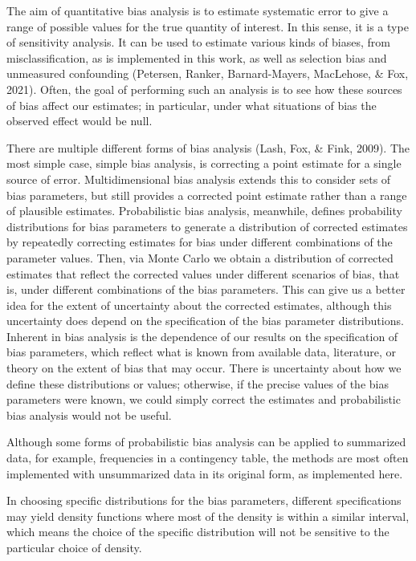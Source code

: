 \documentclass[12pt,twoside]{smiththesis}
\begin{document}
The aim of quantitative bias analysis is to estimate systematic error to give a range of possible values for the true quantity of interest. In this sense, it is a type of sensitivity analysis. It can be used to estimate various kinds of biases, from misclassification, as is implemented in this work, as well as selection bias and unmeasured confounding (Petersen, Ranker, Barnard-Mayers, MacLehose, \& Fox, 2021). Often, the goal of performing such an analysis is to see how these sources of bias affect our estimates; in particular, under what situations of bias the observed effect would be null.

There are multiple different forms of bias analysis (Lash, Fox, \& Fink, 2009). The most simple case, simple bias analysis, is correcting a point estimate for a single source of error. Multidimensional bias analysis extends this to consider sets of bias parameters, but still provides a corrected point estimate rather than a range of plausible estimates. Probabilistic bias analysis, meanwhile, defines probability distributions for bias parameters to generate a distribution of corrected estimates by repeatedly correcting estimates for bias under different combinations of the parameter values. Then, via Monte Carlo we obtain a distribution of corrected estimates that reflect the corrected values under different scenarios of bias, that is, under different combinations of the bias parameters. This can give us a better idea for the extent of uncertainty about the corrected estimates, although this uncertainty does depend on the specification of the bias parameter distributions. Inherent in bias analysis is the dependence of our results on the specification of bias parameters, which reflect what is known from available data, literature, or theory on the extent of bias that may occur. There is uncertainty about how we define these distributions or values; otherwise, if the precise values of the bias parameters were known, we could simply correct the estimates and probabilistic bias analysis would not be useful.

Although some forms of probabilistic bias analysis can be applied to summarized data, for example, frequencies in a contingency table, the methods are most often implemented with unsummarized data in its original form, as implemented here.

In choosing specific distributions for the bias parameters, different specifications may yield density functions where most of the density is within a similar interval, which means the choice of the specific distribution will not be sensitive to the particular choice of density.
\end{document}
